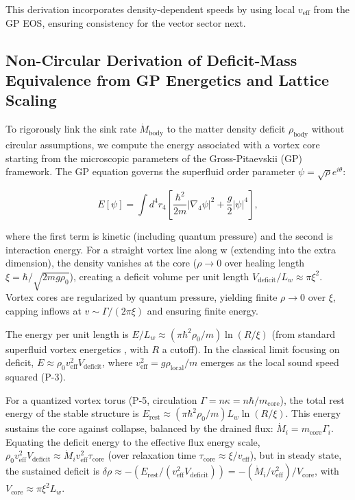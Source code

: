 \documentclass{article}
\begin{document}
This derivation incorporates density-dependent speeds by using local $v_{\text{eff}}$ from the GP EOS, ensuring consistency for the vector sector next.

\subsection{Non-Circular Derivation of Deficit-Mass Equivalence from GP Energetics and Lattice Scaling}

To rigorously link the sink rate $\dot{M}_{\text{body}}$ to the matter density deficit $\rho_{\text{body}}$ without circular assumptions, we compute the energy associated with a vortex core starting from the microscopic parameters of the Gross-Pitaevskii (GP) framework. The GP equation governs the superfluid order parameter $\psi = \sqrt{\rho} e^{i \theta}$:

\[
E[\psi] = \int d^4 r_4 \left[ \frac{\hbar^2}{2 m} |\nabla_4 \psi|^2 + \frac{g}{2} |\psi|^4 \right],
\]

where the first term is kinetic (including quantum pressure) and the second is interaction energy. For a straight vortex line along w (extending into the extra dimension), the density vanishes at the core ($\rho \to 0$ over healing length $\xi = \hbar / \sqrt{2 m g \rho_0}$), creating a deficit volume per unit length $V_{\text{deficit}} / L_w \approx \pi \xi^2$. Vortex cores are regularized by quantum pressure, yielding finite $\rho \to 0$ over $\xi$, capping inflows at $v \sim \Gamma / (2\pi \xi)$ and ensuring finite energy.

The energy per unit length is $E / L_w \approx (\pi \hbar^2 \rho_0 / m) \ln(R / \xi)$ (from standard superfluid vortex energetics \cite{onsager1949, feynman1955}, with $R$ a cutoff). In the classical limit focusing on deficit, $E \approx \rho_0 v_{\text{eff}}^2 V_{\text{deficit}}$, where $v_{\text{eff}}^2 = g \rho_{\text{local}} / m$ emerges as the local sound speed squared (P-3).

For a quantized vortex torus (P-5, circulation $\Gamma = n \kappa = n \hbar / m_{\text{core}}$), the total rest energy of the stable structure is $E_{\text{rest}} \approx (\pi \hbar^2 \rho_0 / m) L_w \ln(R / \xi)$. This energy sustains the core against collapse, balanced by the drained flux: $\dot{M}_i = m_{\text{core}} \Gamma_i$. Equating the deficit energy to the effective flux energy scale, $\rho_0 v_{\text{eff}}^2 V_{\text{deficit}} \approx \dot{M}_i v_{\text{eff}}^2 \tau_{\text{core}}$ (over relaxation time $\tau_{\text{core}} \approx \xi / v_{\text{eff}}$), but in steady state, the sustained deficit is $\delta \rho \approx - (E_{\text{rest}} / (v_{\text{eff}}^2 V_{\text{deficit}})) = - (\dot{M}_i / v_{\text{eff}}^2) / V_{\text{core}}$, with $V_{\text{core}} \approx \pi \xi^2 L_w$.
\end{document}
